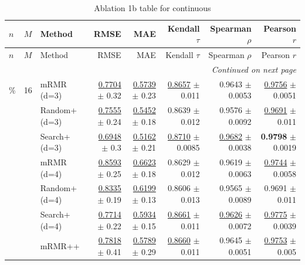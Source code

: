 \footnotesize
\setlength{\tabcolsep}{2pt}
\renewcommand{\arraystretch}{1.05}
\setlength{\LTpre}{0pt}
\setlength{\LTpost}{0pt}
\setlength{\LTleft}{\fill}
\setlength{\LTright}{\fill}
\begin{longtable}{llp{}rrrrr}
\caption{Ablation 1b table for continuous}\label{tab:ablation\_1b\_continuous}\\
\toprule
$n$ & $M$ & Method & RMSE & MAE & Kendall $\tau$ & Spearman $\rho$ & Pearson $r$ \\
\midrule
\endfirsthead
\toprule
$n$ & $M$ & Method & RMSE & MAE & Kendall $\tau$ & Spearman $\rho$ & Pearson $r$ \\
\midrule
\endhead
\midrule
\multicolumn{8}{r}{\emph{Continued on next page}} \\
\midrule
\endfoot
\bottomrule
\endlastfoot
5\% & 16 & mRMR (d=3) & \underline{0.7704} {\scriptsize $\pm$ 0.32} & \underline{0.5739} {\scriptsize $\pm$ 0.23} & \underline{0.8657} {\scriptsize $\pm$ 0.011} & 0.9643 {\scriptsize $\pm$ 0.0053} & \underline{0.9756} {\scriptsize $\pm$ 0.0051} \\
 &  & Random+ (d=3) & \underline{0.7555} {\scriptsize $\pm$ 0.24} & \underline{0.5452} {\scriptsize $\pm$ 0.18} & 0.8639 {\scriptsize $\pm$ 0.012} & 0.9576 {\scriptsize $\pm$ 0.0092} & \underline{0.9691} {\scriptsize $\pm$ 0.011} \\
 &  & Search+ (d=3) & \underline{0.6948} {\scriptsize $\pm$ 0.3} & \underline{0.5162} {\scriptsize $\pm$ 0.21} & \underline{0.8710} {\scriptsize $\pm$ 0.0085} & \underline{0.9682} {\scriptsize $\pm$ 0.0038} & \textbf{0.9798} {\scriptsize $\pm$ 0.0019} \\
 &  & mRMR (d=4) & \underline{0.8593} {\scriptsize $\pm$ 0.25} & \underline{0.6623} {\scriptsize $\pm$ 0.18} & 0.8629 {\scriptsize $\pm$ 0.012} & 0.9619 {\scriptsize $\pm$ 0.0063} & \underline{0.9744} {\scriptsize $\pm$ 0.0058} \\
 &  & Random+ (d=4) & \underline{0.8335} {\scriptsize $\pm$ 0.19} & \underline{0.6199} {\scriptsize $\pm$ 0.13} & 0.8606 {\scriptsize $\pm$ 0.013} & 0.9565 {\scriptsize $\pm$ 0.0089} & 0.9691 {\scriptsize $\pm$ 0.011} \\
 &  & Search+ (d=4) & \underline{0.7714} {\scriptsize $\pm$ 0.22} & \underline{0.5934} {\scriptsize $\pm$ 0.15} & \underline{0.8661} {\scriptsize $\pm$ 0.011} & \underline{0.9626} {\scriptsize $\pm$ 0.0072} & \underline{0.9775} {\scriptsize $\pm$ 0.0039} \\
 &  & mRMR++ & \underline{0.7818} {\scriptsize $\pm$ 0.41} & \underline{0.5789} {\scriptsize $\pm$ 0.29} & \underline{0.8660} {\scriptsize $\pm$ 0.011} & 0.9645 {\scriptsize $\pm$ 0.0051} & \underline{0.9753} {\scriptsize $\pm$ 0.005} \\

\end{longtable}
